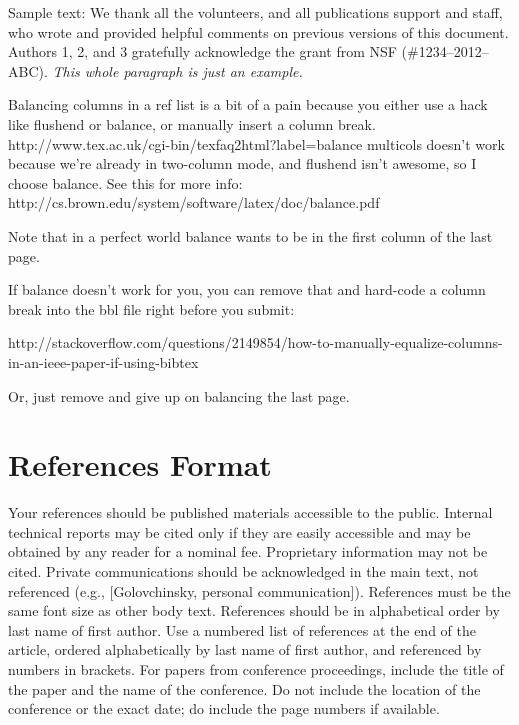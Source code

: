 \documentclass{sigchi}
\begin{document}
Sample text: We thank all the volunteers, and all publications support
and staff, who wrote and provided helpful comments on previous
versions of this document. Authors 1, 2, and 3 gratefully acknowledge
the grant from NSF (\#1234--2012--ABC). \textit{This whole paragraph is
  just an example.}

 Balancing columns in a ref list is a bit of a pain because you
 either use a hack like flushend or balance, or manually insert
 a column break.  http://www.tex.ac.uk/cgi-bin/texfaq2html?label=balance
 multicols doesn't work because we're already in two-column mode,
 and flushend isn't awesome, so I choose balance.  See this
 for more info: http://cs.brown.edu/system/software/latex/doc/balance.pdf

 Note that in a perfect world balance wants to be in the first
 column of the last page.

 If balance doesn't work for you, you can remove that and
 hard-code a column break into the bbl file right before you
 submit:

 http://stackoverflow.com/questions/2149854/how-to-manually-equalize-columns-
 in-an-ieee-paper-if-using-bibtex

 Or, just remove \balance and give up on balancing the last page.

\balance{}

\section{References Format}
Your references should be published materials accessible to the
public. Internal technical reports may be cited only if they are
easily accessible and may be obtained by any reader for a nominal
fee. Proprietary information may not be cited. Private communications
should be acknowledged in the main text, not referenced (e.g.,
[Golovchinsky, personal communication]). References must be the same
font size as other body text. References should be in alphabetical
order by last name of first author. Use a numbered list of references
at the end of the article, ordered alphabetically by last name of
first author, and referenced by numbers in brackets. For papers from
conference proceedings, include the title of the paper and the name of
the conference. Do not include the location of the conference or the
exact date; do include the page numbers if available. 
\end{document}
